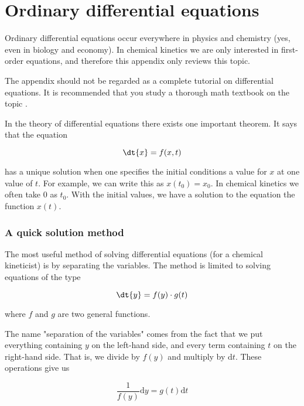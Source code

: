 \chapter{Ordinary differential equations}
\label{chap:ode}

Ordinary differential equations occur everywhere in physics and
chemistry (yes, even in biology and economy). In chemical kinetics we
are only interested in first-order equations, and therefore this
appendix only reviews this topic.

The appendix should not be regarded as a complete tutorial on
differential equations. It is recommended that you study a thorough
math textbook on the topic \eg \cite{kreyszig}.

In the theory of differential equations there exists one important
theorem. It says that the equation

\begin{equation}
  \dt{x} = f(x, t)
\end{equation}

has a unique solution when one specifies the initial conditions \ie
a value for $x$ at one value of $t$. For example, we can write this as $x(t_0) = x_0$. In chemical kinetics we often take $0$ as $t_0$. With the initial values, we have a solution to the equation \ie the function $x(t)$.

\subsection{A quick solution method}
\label{sect:ode:quick}

The most useful method of solving differential equations (for a chemical kineticist) is by separating the variables. The method is limited to solving equations of the type

\begin{equation}
  \dt{y} = f(y) \cdot g(t)
\end{equation}

where $f$ and $g$ are two general functions.

The name "separation of the variables" comes from the fact that we put everything containing $y$ on the left-hand side, and every term containing $t$ on the right-hand side. That is, we divide by $f(y)$ and multiply by $\mathrm{d}t$. These operations give us

\begin{equation}
  \frac{1}{f(y)} \mathrm{d}y = g(t) \mathrm{d}t
\end{equation}

